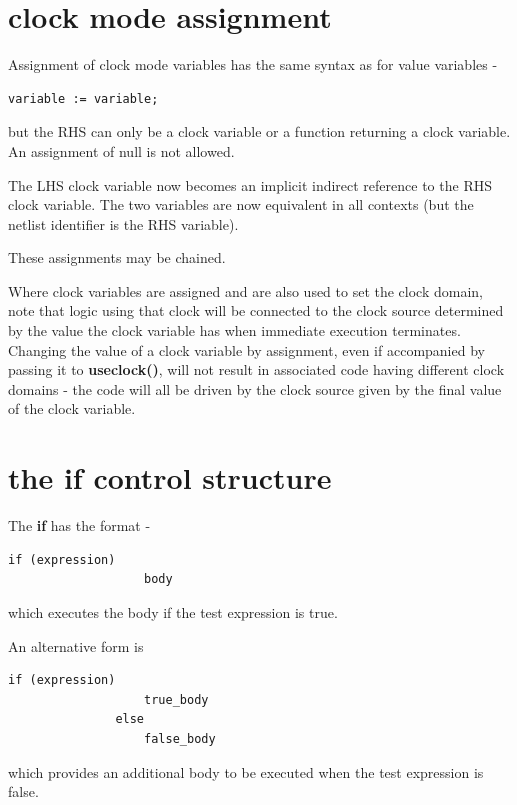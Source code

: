     \section{clock mode assignment}\label{sec:clockass}
    
        Assignment of clock mode variables has the same syntax as for value
        variables -
        \begin{lstlisting}[gobble=8, language=threepl]
               variable := variable;
        \end{lstlisting}
        but the RHS can only be a clock variable or a function returning
        a clock variable. An assignment of null is not allowed.
            
        The LHS clock variable now becomes an implicit indirect reference to
        the RHS clock variable. The two variables are now equivalent in all
        contexts (but the netlist identifier is the RHS variable).
        
        These assignments may be chained.
            
        Where clock variables are assigned and are also used to set the clock
        domain, note that logic using that clock will be connected to the
        clock source determined by the value the clock variable has when
        immediate execution terminates. Changing the value of a clock variable
        by assignment, even if accompanied by passing it to {\bf useclock()},
        will not result in associated code having different clock domains -
        the code will all be driven by the clock source given by the final
        value of the clock variable.
        



    \section{the {\bf if} control structure}\label{sec:im_if_struct}

        The {\bf if} has the format -
        \begin{lstlisting}[gobble=8, language=threepl]
               if (expression)
                   body
        \end{lstlisting}
        which executes the body if the test expression is true.

        An alternative form is 
        \begin{lstlisting}[gobble=8, language=threepl]
               if (expression)
                   true_body
               else
                   false_body
        \end{lstlisting}
        which provides an additional body to be executed when
        the test expression is false.

